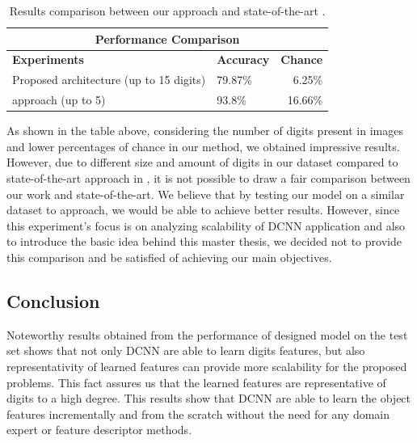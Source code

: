 
\begin{table}[H]
\centering
\small\sffamily
\begin{tabular}{llr}
\multicolumn{3}{c}{\textbf{\textbf{Performance Comparison}}} \\
\bottomrule
\textbf{Experiments}  &   \textbf{Accuracy} & \textbf{Chance} \\
\bottomrule
Proposed architecture (up to 15 digits)     & 79.87\% & 6.25\% \\
\citet{segui2015learning} approach (up to 5)& 93.8\% & 16.66\%  \\

\bottomrule
\end{tabular}
\caption{Results comparison between our approach and state-of-the-art \cite{segui2015learning}.}
\label{tab:comp}
\end{table} 

As shown in the table above, considering the number of digits present in images and lower percentages of chance in our method, we obtained impressive results. However, due to different size and amount of digits in our dataset compared to state-of-the-art approach in \cite{segui2015learning}, it is not possible to draw a fair comparison between our work and state-of-the-art. We believe that by testing our model on a similar dataset to \citet{segui2015learning} approach, we would be able to achieve better results. However, since this experiment's focus is on analyzing scalability of DCNN application and also to introduce the basic idea behind this master thesis, we decided not to provide this comparison and be satisfied of achieving our main objectives.  

\subsection{Conclusion}

Noteworthy results obtained from the performance of designed model on the test set shows that not only DCNN are able to learn digits features, but also representativity of learned features can provide more scalability for the proposed problems. This fact assures us that the learned features are representative of digits to a high degree. This results show that DCNN are able to learn the object features incrementally and from the scratch without the need for any domain expert or feature descriptor methods. 

